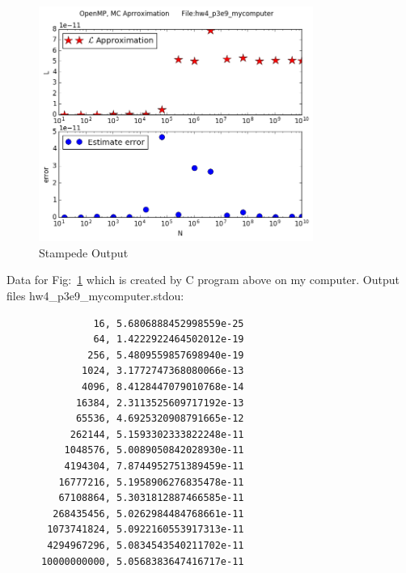 \documentclass{article}
\begin{document}
\begin{figure}[htb]
	\begin{center}
		\includegraphics[width=0.8\textwidth]{hw4_p3e9_mycomputer.png}
	\end{center}
	\caption{Stampede Output}
	\label{fig:hw4_p3e9_mycomputer}
\end{figure}

Data for Fig:\ \ref{fig:hw4_p3e9_mycomputer}  which is created by C program above on my computer. Output files hw4\_p3e9\_mycomputer.stdou: 
\begin{lstlisting}
               16, 5.6806888452998559e-25 
               64, 1.4222922464502012e-19 
              256, 5.4809559857698940e-19 
             1024, 3.1772747368080066e-13 
             4096, 8.4128447079010768e-14 
            16384, 2.3113525609717192e-13 
            65536, 4.6925320908791665e-12 
           262144, 5.1593302333822248e-11 
          1048576, 5.0089050842028930e-11 
          4194304, 7.8744952751389459e-11 
         16777216, 5.1958906276835478e-11 
         67108864, 5.3031812887466585e-11 
        268435456, 5.0262984484768661e-11 
       1073741824, 5.0922160553917313e-11 
       4294967296, 5.0834543540211702e-11 
      10000000000, 5.0568383647416717e-11
               
                
\end{lstlisting}
\end{document}
